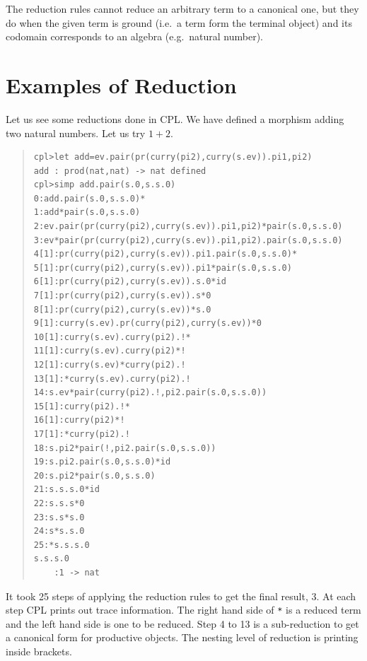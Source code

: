 The reduction rules cannot reduce an arbitrary term to a canonical one, but
they do when the given term is ground (i.e.\ a term form the terminal
object) and its codomain corresponds to an algebra (e.g.\ natural number).


\section{Examples of Reduction}

Let us see some reductions done in CPL.  We have defined a morphism adding
two natural numbers.  Let us try $1+2$.
\begin{quote}
\begin{verbatim}
cpl>let add=ev.pair(pr(curry(pi2),curry(s.ev)).pi1,pi2)
add : prod(nat,nat) -> nat defined
cpl>simp add.pair(s.0,s.s.0)
0:add.pair(s.0,s.s.0)*
1:add*pair(s.0,s.s.0)
2:ev.pair(pr(curry(pi2),curry(s.ev)).pi1,pi2)*pair(s.0,s.s.0)
3:ev*pair(pr(curry(pi2),curry(s.ev)).pi1,pi2).pair(s.0,s.s.0)
4[1]:pr(curry(pi2),curry(s.ev)).pi1.pair(s.0,s.s.0)*
5[1]:pr(curry(pi2),curry(s.ev)).pi1*pair(s.0,s.s.0)
6[1]:pr(curry(pi2),curry(s.ev)).s.0*id
7[1]:pr(curry(pi2),curry(s.ev)).s*0
8[1]:pr(curry(pi2),curry(s.ev))*s.0
9[1]:curry(s.ev).pr(curry(pi2),curry(s.ev))*0
10[1]:curry(s.ev).curry(pi2).!*
11[1]:curry(s.ev).curry(pi2)*!
12[1]:curry(s.ev)*curry(pi2).!
13[1]:*curry(s.ev).curry(pi2).!
14:s.ev*pair(curry(pi2).!,pi2.pair(s.0,s.s.0))
15[1]:curry(pi2).!*
16[1]:curry(pi2)*!
17[1]:*curry(pi2).!
18:s.pi2*pair(!,pi2.pair(s.0,s.s.0))
19:s.pi2.pair(s.0,s.s.0)*id
20:s.pi2*pair(s.0,s.s.0)
21:s.s.s.0*id
22:s.s.s*0
23:s.s*s.0
24:s*s.s.0
25:*s.s.s.0
s.s.s.0
    :1 -> nat
\end{verbatim}
\end{quote}
It took 25 steps of applying the reduction rules to get the final result,
$3$.  At each step CPL prints out trace information.  The right hand side
of \verb"*" is a reduced term and the left hand side is one to be reduced.
Step 4 to 13 is a sub-reduction to get a canonical form for productive
objects.  The nesting level of reduction is printing inside brackets.


